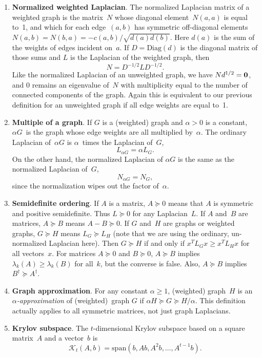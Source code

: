 \documentclass[11pt]{article}
\newcommand{\m}[1]{{\bf{#1}}}       %
\newcommand{\zeros}{\m0}            %
\newcommand{\Diag}{\mbox{Diag}}
\newcommand{\pinv}{^{\dagger}}                  %
\newcommand{\krylov}{\mathcal{K}}   %
\begin{document}
\begin{enumerate}
\item\label{wnorm}{\bf Normalized weighted Laplacian}.
The normalized Laplacian matrix of a weighted graph is the matrix~$N$
whose diagonal element~$N(a,a)$ is equal to~1,
and which for each edge~$(a,b)$ has symmetric off-diagonal elements 
$N(a,b) = N(b,a) = -c(a,b)/\sqrt{d(a)d(b)}$.
Here $d(a)$ is the sum of the weights of edges incident on~$a$.
If $D = \Diag(d)$ is the diagonal matrix of those sums
and $L$ is the Laplacian of the weighted graph, then
$$N = D^{-1/2}LD^{-1/2}.$$
Like the normalized Laplacian of an unweighted graph, 
we have $Nd^{1/2}=\zeros$, 
and 0 remains an eigenvalue of~$N$ with multiplicity equal to the 
number of connected components of the graph.
Again this is equivalent to our previous definition for an unweighted graph
if all edge weights are equal to~1.

\item {\bf Multiple of a graph}.
If $G$ is a (weighted) graph and $\alpha>0$ is a constant, $\alpha G$~is the
graph whose edge weights are all multiplied by~$\alpha$.
The ordinary Laplacian of~$\alpha G$ is $\alpha$~times the Laplacian of~$G$,
$$L_{\alpha G} = \alpha L_G.$$ 
On the other hand, the normalized Laplacian of $\alpha G$ is the same as the
normalized Laplacian of~$G$, 
$$N_{\alpha G} = N_G,$$ 
since the normalization wipes out the factor of~$\alpha$.

\item {\bf Semidefinite ordering}.
If $A$ is a matrix, $A\succeq0$ means that $A$ is symmetric and positive semidefinite.
Thus $L\succeq 0$ for any Laplacian~$L$.
If $A$ and~$B$ are matrices, $A\succeq B$ means $A-B\succeq 0$.
If $G$ and~$H$ are graphs or weighted graphs, $G\succeq H$ means $L_G\succeq L_H$
(note that we are using the ordinary, un-normalized Laplacian here).
Then $G\succeq H$ if and only if $x^TL_Gx \geq x^TL_Hx$ for all vectors~$x$.
For matrices $A \succeq 0$ and $B \succeq 0$,
$A\succeq B$ implies $\lambda_k(A) \geq \lambda_k(B)$ for all~$k$,
but the converse is false.
Also, $A \succeq B$ implies $B\pinv \succeq A\pinv$.

\item {\bf Graph approximation}.
For any constant $\alpha\geq 1$, (weighted) graph~$H$ is an {\em $\alpha$-approximation} 
of (weighted)~graph $G$ if $\alpha H \succeq G \succeq H/\alpha$.
This definition actually applies to all symmetric matrices, not just graph Laplacians.

\item{\bf Krylov subspace}.
The $t$-dimensional Krylov subspace based on a square matrix~$A$ 
and a vector~$b$ is 
$$\krylov_t(A,b) = \mbox{span}(b,Ab,A^2b,\ldots,A^{t-1}b).$$


\end{enumerate}
\end{document}
